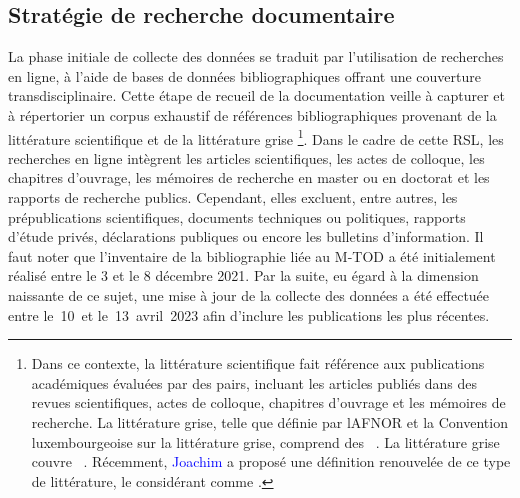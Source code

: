 \begin{refsegment}
\subsection{Stratégie de recherche documentaire
    \label{chap2:strategie-recherche-documentaire}
    }

La phase initiale de collecte des données se traduit par l'utilisation de recherches en ligne, à l'aide de bases de données bibliographiques offrant une couverture transdisciplinaire. Cette étape de recueil de la documentation veille à capturer et à répertorier un corpus exhaustif de références bibliographiques provenant de la littérature scientifique et de la littérature grise
    \footnote{
        Dans ce contexte, la littérature scientifique fait référence aux publications académiques évaluées par des pairs, incluant les articles publiés dans des revues scientifiques, actes de colloque, chapitres d'ouvrage et les mémoires de recherche. La littérature grise, telle que définie par l\acrfull{AFNOR} et la Convention luxembourgeoise sur la littérature grise, comprend des ~\textcolor{blue}{\autocite[30]{schopfel_comprendre_2015}}. La littérature grise couvre ~\textcolor{blue}{\autocite{national_grey_literature_collection_luxembourg_nodate}}. Récemment, \textcolor{blue}{Joachim} \textcolor{blue}{\textcite[9]{schopfel_vers_2012}} a proposé une définition renouvelée de ce type de littérature, le considérant comme .
}. Dans le cadre de cette \acrshort{RSL}, les recherches en ligne intègrent les articles scientifiques, les actes de colloque, les chapitres d'ouvrage, les mémoires de recherche en master ou en doctorat et les rapports de recherche publics. Cependant, elles excluent, entre autres, les prépublications scientifiques, documents techniques ou politiques, rapports d'étude privés, déclarations publiques ou encore les bulletins d'information. Il faut noter que l'inventaire de la bibliographie liée au \acrshort{M-TOD} a été initialement réalisé entre le 3 et le 8 décembre 2021. Par la suite, eu égard à la dimension naissante de ce sujet, une mise à jour de la collecte des données a été effectuée entre le~10~et le~13~avril~2023 afin d'inclure les publications les plus récentes.%


\end{refsegment}
